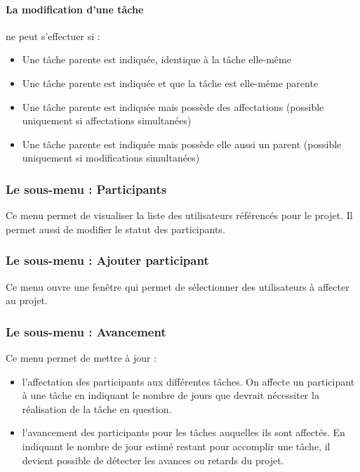 \paragraph{La modification d'une tâche} ne peut s'effectuer si :
\begin{itemize}
\item Une tâche parente est indiquée, identique à la tâche elle-même
\item Une tâche parente est indiquée et que la tâche est elle-même parente
\item Une tâche parente est indiquée mais possède des affectations (possible uniquement si affectations simultanées)
\item Une tâche parente est indiquée mais possède elle aussi un parent (possible uniquement si modifications simultanées)
\end{itemize}


\subsubsection{Le sous-menu : Participants}

Ce menu permet de visualiser la liste des utilisateurs référencés pour le projet. Il permet aussi de modifier le statut des participants.


\subsubsection{Le sous-menu : Ajouter participant}

Ce menu ouvre une fenêtre qui permet de sélectionner des utilisateurs à affecter au projet.


\subsubsection{Le sous-menu : Avancement}

Ce menu permet de mettre à jour :\\
\begin{itemize}
\item l'affectation des participants aux différentes tâches. On affecte un participant à une tâche en indiquant le nombre de jours que devrait nécessiter la réalisation de la tâche en question.
\item l'avancement des participants pour les tâches auquelles ils sont affectés. En indiquant le nombre de jour estimé restant pour accomplir une tâche, il devient possible de détecter les avances ou retards du projet.
\end {itemize}
\vspace{0.3cm}

